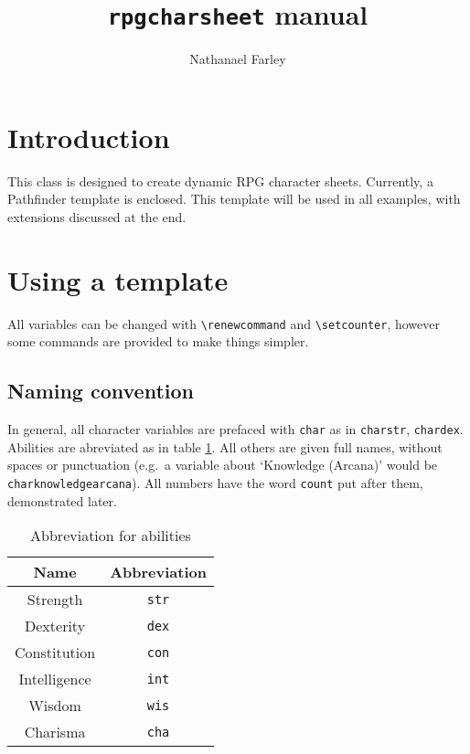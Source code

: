 \documentclass[oneside]{article}
\begin{document}
\title{\texttt{rpgcharsheet} manual}
\author{Nathanael Farley}
\maketitle

\section{Introduction}
\label{sec:introduction}

This class is designed to create dynamic RPG character sheets. Currently, a Pathfinder template is enclosed. This template will be used in all examples, with extensions discussed at the end.

\section{Using a template}
\label{sec:using-template}

All variables can be changed with \verb=\renewcommand= and \verb=\setcounter=, however some commands are provided to make things simpler.

\subsection{Naming convention}
\label{sec:naming-convention}

In general, all character variables are prefaced with \verb=char= as in \verb=charstr=, \verb=chardex=. Abilities are abreviated as in table \ref{tab:abbrev}. All others are given full names, without spaces or punctuation (e.g.\ a variable about `Knowledge (Arcana)' would be \verb=charknowledgearcana=). All numbers have the word \verb=count= put after them, demonstrated later.

\begin{table}[h]
  \centering
  \begin{tabular}{c c }
    Name & Abbreviation\\\hline
    Strength & \verb=str=\\
    Dexterity & \verb=dex=\\
    Constitution & \verb=con=\\
    Intelligence & \verb=int=\\
    Wisdom & \verb=wis=\\
    Charisma & \verb=cha=\\\hline
  \end{tabular}
  \caption{Abbreviation for abilities}
  \label{tab:abbrev}
\end{table}
\end{document}
